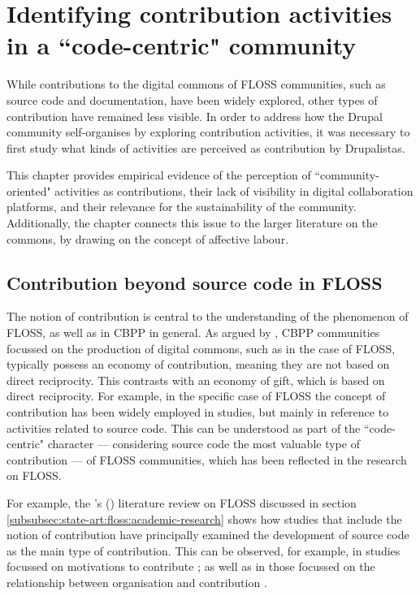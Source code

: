 \chapter{Identifying contribution activities in a ``code-centric" community}
\label{identifyng-contribution:chapter}

While contributions to the digital commons of FLOSS communities, such as source code and documentation, have been widely explored, other types of contribution have remained less visible. In order to address how the Drupal community self-organises by exploring contribution activities, it was necessary to first study what kinds of activities are perceived as contribution by Drupalistas.

This chapter provides empirical evidence of the perception of ``community-oriented" activities as contributions, their lack of visibility in digital collaboration platforms, and their relevance for the sustainability of the community. Additionally, the chapter connects this issue to the larger literature on the commons, by drawing on the concept of affective labour.

\section{Contribution beyond source code in FLOSS}

The notion of contribution is central to the understanding of the phenomenon of FLOSS, as well as in CBPP in general. As argued by \textcite{wittel2013counter}, CBPP communities focussed on the production of digital commons, such as in the case of FLOSS, typically possess an economy of contribution, meaning they are not based on direct reciprocity. This contrasts with an economy of gift, which is based on direct reciprocity. For example, in the specific case of FLOSS the concept of contribution has been widely employed in studies, but mainly in reference to activities related to source code. This can be understood as part of the ``code-centric" character --- considering source code the most valuable type of contribution --- of FLOSS communities, which has been reflected in the research on FLOSS.

For example, the \citeauthor{VonKrogh2006}'s (\citeyear{VonKrogh2006}) literature review on FLOSS discussed in section \ref{subsubsec:state-art:floss:academic-research} shows how studies that include the notion of contribution have principally examined the development of source code as the main type of contribution. This can be observed, for example, in studies focussed on motivations to contribute \parencite[e.g.,][]{bergquist2001power,  ghosh2002free, Lerner2002, dalle2003allocation, lakhani2003hackers, stenborg2004explaining}; as well as in those focussed on the relationship between organisation and contribution \parencite[e.g.,][]{franck2002reconciling, dempsey2002open, koch2002effort, grewal2006location, maccormack2006exploring}.

